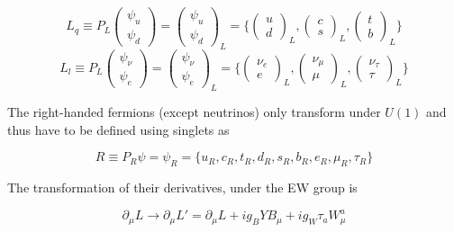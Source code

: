 \begin{equation}
    L_q \equiv P_L \begin{pmatrix} \psi_u \\ \psi_d \end{pmatrix} = \begin{pmatrix} \psi_u \\ \psi_d \end{pmatrix}_L = \Bigg\{ \begin{pmatrix} u \\ d \end{pmatrix}_L , \begin{pmatrix} c \\ s \end{pmatrix}_L , \begin{pmatrix} t \\ b \end{pmatrix}_L \Bigg\} 
\end{equation}
\begin{equation}
    L_l \equiv P_L \begin{pmatrix} \psi_{\nu} \\ \psi_e \end{pmatrix} = \begin{pmatrix} \psi_{\nu} \\ \psi_e \end{pmatrix}_L = \Bigg\{ \begin{pmatrix} \nu_e \\ e \end{pmatrix}_L , \begin{pmatrix} \nu_{\mu} \\ \mu \end{pmatrix}_L , \begin{pmatrix} \nu_{\tau} \\ \tau \end{pmatrix}_L \Bigg\} 
\end{equation}

The right-handed fermions (except neutrinos) only transform under $U(1)$ and thus have to be defined using singlets as

\begin{equation}
    R \equiv P_R \psi = \psi_R = \Bigg\{ u_R,c_R,t_R,d_R,s_R,b_R,e_R,\mu_R,\tau_R  \Bigg\}
\end{equation}

The transformation of their derivatives, under the EW group is

\begin{equation}
    \partial_{\mu}L \rightarrow \partial_{\mu}L' = \partial_{\mu}L + ig_B YB_{\mu} + ig_W \tau_a W_{\mu}^a
\end{equation}

